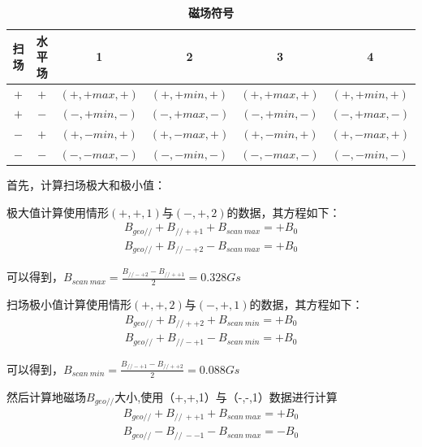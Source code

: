 \documentclass[10pt,hyperref,a4paper,UTF8]{ctexart}
\newcommand{\pll}{/\!/}
\begin{document}
                \begin{table}[htbp]
                        \caption{\textbf{磁场符号}}
                        \setlength{\tabcolsep}{0.6cm}
                        \centering
                        \begin{tabular}{cccccc}
                        \toprule
                        扫场&水平场&1&2&3&4 \\
                        \midrule
                        $+$&$+$& $(+,+max,+)$ & $(+,+min,+)$ & $(+,+max,+)$ & $(+,+min,+)$ \\
                        $+$&$-$& $(-,+min,-)$ & $(-,+max,-)$ & $(-,+min,-)$ & $(-,+max,-)$ \\
                        $-$&$+$& $(+,-min,+)$ & $(+,-max,+)$ & $(+,-min,+)$ & $(+,-max,+)$ \\
                        $-$&$-$& $(-,-max,-)$ & $(-,-min,-)$ & $(-,-max,-)$ & $(-,-min,-)$ \\
                        \bottomrule
                        \end{tabular}
                \end{table}\label{tab:磁场符号}

                首先，计算扫场极大和极小值：

                极大值计算使用情形$(+,+,1)$与$(-,+,2)$的数据，其方程如下：
                \begin{align}
                        B_{geo\pll} + B_{\pll ++1} + B_{scan\ max} = + B_0 \\
                        B_{geo\pll} + B_{\pll -+2} - B_{scan\ max} = + B_0
                \end{align}

                可以得到，$B_{scan\ max}=\frac{B_{\pll -+2}-B_{\pll ++1}}{2}=0.328 \unit{Gs}$
                
                扫场极小值计算使用情形$(+,+,2)$与$(-,+,1)$的数据，其方程如下：
                \begin{align}
                        B_{geo\pll} + B_{\pll ++2} + B_{scan\ min} = + B_0 \\
                        B_{geo\pll} + B_{\pll -+1} - B_{scan\ min} = + B_0
                \end{align}

                可以得到，$B_{scan\ min}=\frac{B_{\pll -+1}-B_{\pll ++2}}{2}=0.088 \unit{Gs}$
                
                然后计算地磁场$B_{geo\pll}$大小,使用（+,+,1）与（-,-,1）数据进行计算
                \begin{align}
                        B_{geo\pll} + B_{\pll\ ++1} + B_{scan\ max} = + B_0 \\
                        B_{geo\pll} - B_{\pll\ --1} - B_{scan\ max} = - B_0
                \end{align}
\end{document}
